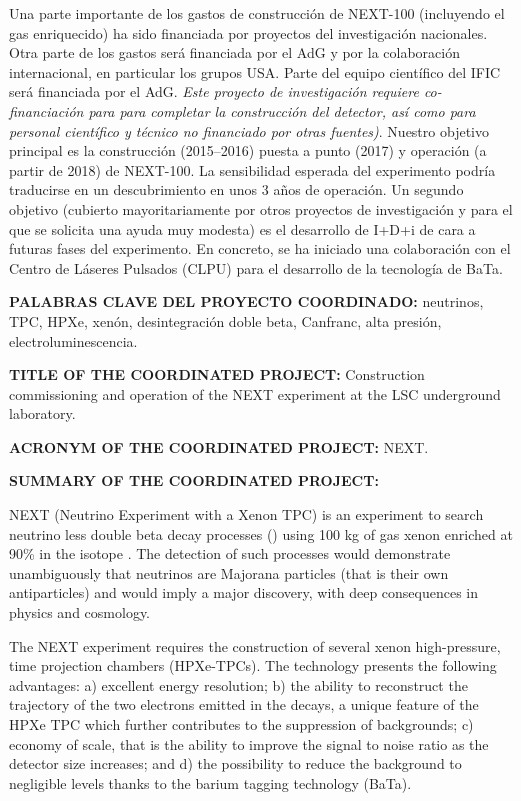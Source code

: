 \documentclass[a4paper,11pt,oneside]{article}
\begin{document}
Una parte importante de los gastos de construcción de NEXT-100 (incluyendo el gas enriquecido) ha sido financiada por proyectos del investigación nacionales. 
 Otra parte de los gastos será financiada por el AdG y por la colaboración internacional, en particular los grupos USA. Parte del equipo científico del IFIC será financiada por el AdG. {\em Este  proyecto de investigación requiere co-financiación para para completar la construcción del detector, así como para personal científico y técnico no financiado por otras fuentes)}. Nuestro objetivo principal es la construcción (2015--2016) puesta a punto (2017) y operación (a partir de 2018) de NEXT-100. La sensibilidad esperada del experimento podría traducirse en un descubrimiento en unos 3 años de operación.  Un segundo objetivo (cubierto mayoritariamente por otros proyectos de investigación y para el que se solicita una ayuda muy modesta) es el desarrollo de I+D+i de cara a futuras fases del experimento. En concreto, se ha iniciado una colaboración con el Centro de Láseres Pulsados (CLPU) para el desarrollo de la tecnología de {\sc BaTa}.
 
 \vspace{0.3cm}

{\bf PALABRAS CLAVE DEL PROYECTO COORDINADO:} neutrinos, TPC, HPXe, xenón, desintegración doble beta, Canfranc, alta presión, electroluminescencia. 

 \vspace{0.6cm}
{\bf TITLE OF THE COORDINATED PROJECT:} Construction commissioning and operation of the NEXT experiment at the LSC underground laboratory. 
\vspace{0.3cm}

{\bf ACRONYM OF THE COORDINATED PROJECT:} NEXT.
\vspace{0.3cm}

{\bf SUMMARY OF THE COORDINATED PROJECT:} 

NEXT (Neutrino Experiment with a Xenon TPC) is an experiment to search neutrino less double beta decay processes  (\bbonu) using 100 kg of gas xenon enriched at  90\% in the isotope \XE. The detection of such processes would demonstrate unambiguously that neutrinos are Majorana particles (that is their own antiparticles) and would imply a major discovery, with deep consequences in physics and cosmology. 

The NEXT experiment requires the construction of several xenon high-pressure, time projection chambers (HPXe-TPCs). The technology presents the following advantages: a) excellent energy resolution; b) the ability to reconstruct the trajectory of the two electrons emitted in the decays, a unique feature of the HPXe TPC which further contributes to the suppression of backgrounds; c) economy of scale, that is the ability to improve the signal to noise ratio as the detector size increases; and d) the possibility to reduce the background to negligible levels thanks to the barium tagging technology ({\sc BaTa}).
\end{document}
